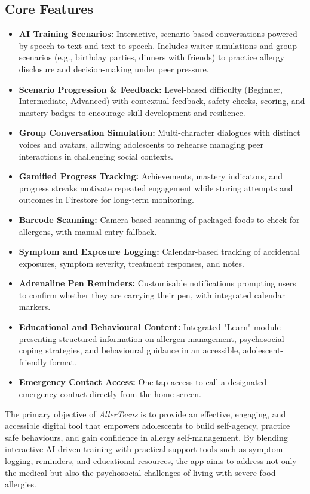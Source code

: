 \documentclass[MScCS]{uccthesis}
\begin{document}
\subsection*{Core Features}
\begin{itemize}
    \item \textbf{AI Training Scenarios:} Interactive, scenario-based conversations powered by speech-to-text and text-to-speech. Includes waiter simulations and group scenarios (e.g., birthday parties, dinners with friends) to practice allergy disclosure and decision-making under peer pressure.
    \item \textbf{Scenario Progression \& Feedback:} Level-based difficulty (Beginner, Intermediate, Advanced) with contextual feedback, safety checks, scoring, and mastery badges to encourage skill development and resilience.
    \item \textbf{Group Conversation Simulation:} Multi-character dialogues with distinct voices and avatars, allowing adolescents to rehearse managing peer interactions in challenging social contexts.
    \item \textbf{Gamified Progress Tracking:} Achievements, mastery indicators, and progress streaks motivate repeated engagement while storing attempts and outcomes in Firestore for long-term monitoring.
    \item \textbf{Barcode Scanning:} Camera-based scanning of packaged foods to check for allergens, with manual entry fallback.
    \item \textbf{Symptom and Exposure Logging:} Calendar-based tracking of accidental exposures, symptom severity, treatment responses, and notes.
    \item \textbf{Adrenaline Pen Reminders:} Customisable notifications prompting users to confirm whether they are carrying their pen, with integrated calendar markers.
    \item \textbf{Educational and Behavioural Content:} Integrated "Learn" module presenting structured information on allergen management, psychosocial coping strategies, and behavioural guidance in an accessible, adolescent-friendly format.
    \item \textbf{Emergency Contact Access:} One-tap access to call a designated emergency contact directly from the home screen.
\end{itemize}

The primary objective of \textit{AllerTeens} is to provide an effective, engaging, and accessible digital tool that empowers adolescents to build self-agency, practice safe behaviours, and gain confidence in allergy self-management. By blending interactive AI-driven training with practical support tools such as symptom logging, reminders, and educational resources, the app aims to address not only the medical but also the psychosocial challenges of living with severe food allergies.  
\end{document}
